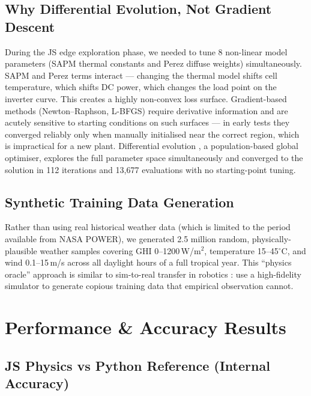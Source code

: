 \documentclass[11pt, a4paper]{article}
\begin{document}
\subsection{Why Differential Evolution, Not Gradient Descent}

During the JS edge exploration phase, we needed to tune 8 non-linear model
parameters (SAPM thermal constants and Perez diffuse weights) simultaneously.
SAPM and Perez terms interact --- changing the thermal model shifts cell
temperature, which shifts DC power, which changes the load point on the inverter
curve. This creates a highly non-convex loss surface. Gradient-based methods
(Newton--Raphson, L-BFGS) require derivative information and are acutely
sensitive to starting conditions on such surfaces --- in early tests they
converged reliably only when manually initialised near the correct region, which
is impractical for a new plant. Differential evolution
\cite{storn1997differential}, a population-based global optimiser, explores the
full parameter space simultaneously and converged to the solution in 112
iterations and 13{,}677 evaluations with no starting-point tuning.

\subsection{Synthetic Training Data Generation}

Rather than using real historical weather data (which is limited to the period
available from NASA POWER), we generated 2.5 million random, physically-plausible
weather samples covering GHI 0--1200\,W/m$^2$, temperature 15--45$^\circ$C,
and wind 0.1--15\,m/s across all daylight hours of a full tropical year. This
``physics oracle'' approach is similar to sim-to-real transfer in robotics
\cite{tobin2017domain}: use a high-fidelity simulator to generate copious
training data that empirical observation cannot.

\section{Performance \& Accuracy Results}

\subsection{JS Physics vs Python Reference (Internal Accuracy)}
\end{document}
